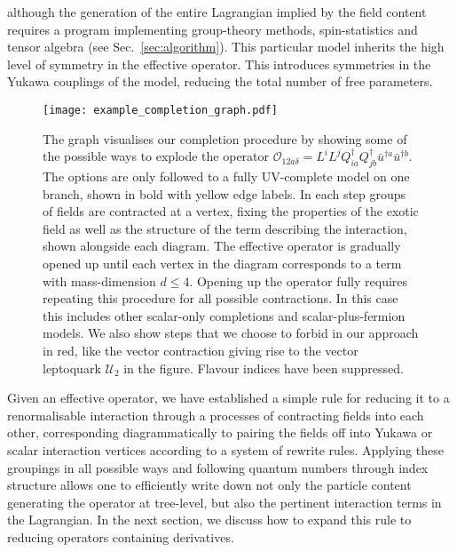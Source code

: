 although the generation of the entire Lagrangian implied by the field content
requires a program implementing group-theory methods, spin-statistics and tensor
algebra (see Sec.~\ref{sec:algorithm}). This particular model inherits the high
level of symmetry in the effective operator. This introduces symmetries in the
Yukawa couplings of the model, reducing the total number of free parameters.

\begin{figure}
  \centering
  \texttt{[image: example\_completion\_graph.pdf]}
  \caption[The graph visualises our completion procedure by showing some of the
  possible ways to explode the operator
  $\mathcal{O}_{12a\delta} = L^{i} L^{j} Q^{\dagger}_{ia} Q^{\dagger}_{jb} \bar{u}^{\dagger a} \bar{u}^{\dagger b}$.]{The
    graph visualises our completion procedure by showing some of the possible
    ways to explode the operator
    $\mathcal{O}_{12a\delta} = L^{i} L^{j} Q^{\dagger}_{ia} Q^{\dagger}_{jb} \bar{u}^{\dagger a} \bar{u}^{\dagger b}$.
    The options are only followed to a fully UV-complete model on one branch,
    shown in bold with yellow edge labels. In each step groups of fields are
    contracted at a vertex, fixing the properties of the exotic field as well as
    the structure of the term describing the interaction, shown alongside each
    diagram. The effective operator is gradually opened up until each vertex in
    the diagram corresponds to a term with mass-dimension $d \leq 4$. Opening up
    the operator fully requires repeating this procedure for all possible
    contractions. In this case this includes other scalar-only completions and
    scalar-plus-fermion models. We also show steps that we choose to forbid in
    our approach in red, like the vector contraction giving rise to the vector
    leptoquark $\mathcal{U}_{2}$ in the figure. Flavour indices have been
    suppressed.}
  \label{fig:example-completion-graph}
\end{figure}

Given an effective operator, we have established a simple rule for reducing it
to a renormalisable interaction through a processes of contracting fields into
each other, corresponding diagrammatically to pairing the fields off into Yukawa
or scalar interaction vertices according to a system of rewrite rules. Applying
these groupings in all possible ways and following quantum numbers through index
structure allows one to efficiently write down not only the particle content
generating the operator at tree-level, but also the pertinent interaction terms
in the Lagrangian. In the next section, we discuss how to expand this rule to
reducing operators containing derivatives.

